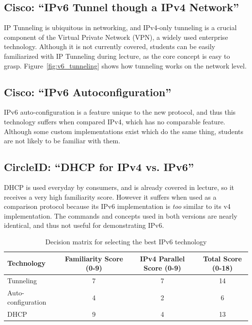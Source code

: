 \documentclass[12pt]{article}
\begin{document}
\subsection{Cisco: ``IPv6 Tunnel though a IPv4 Network''}
IP Tunneling is ubiquitous in networking, and IPv4-only tunneling is a crucial component of the Virtual Private Network (VPN), a widely used enterprise technology. Although it is not currently covered, students can be easily familiarized with IP Tunneling during lecture, as the core concept is easy to grasp. Figure~\ref{fig:v6_tunneling} shows how tunneling works on the network level.

\subsection{Cisco: ``IPv6 Autoconfiguration''}
IPv6 auto-configuration is a feature unique to the new protocol, and thus this technology suffers when compared IPv4, which has no comparable feature. Although some custom implementations exist which do the same thing, students are not likely to be familiar with them.

\subsection{CircleID: ``DHCP for IPv4 vs. IPv6''}
DHCP is used everyday by consumers, and is already covered in lecture, so it receives a very high familiarity score. However it suffers when used as a comparison protocol because its IPv6 implementation is \textit{too} similar to its v4 implementation. The commands and concepts used in both versions are nearly identical, and thus not useful for demonstrating IPv6.

\medskip
\begin{table}[h!]
  \centering
  \label{table:dec_matrix}
  \begin{tabulary}{\textwidth}{|L|C|C|C|}
    \hline
    Technology & Familiarity Score (0-9) & IPv4 Parallel Score (0-9) & Total Score (0-18) \\ \hline\hline
    Tunneling          & 7 & 7 & 14 \\ \hline
    Auto-configuration & 4 & 2 & 6 \\ \hline
    DHCP               & 9 & 4 & 13 \\ \hline
  \end{tabulary}
  \caption{Decision matrix for selecting the best IPv6 technology}
\end{table}
\end{document}
